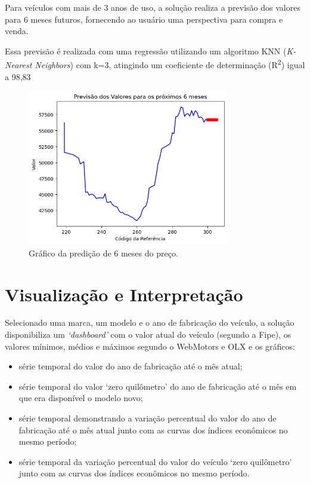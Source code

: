 \documentclass[conference]{IEEEtran}
\begin{document}
Para veículos com mais de 3 anos de uso, a solução realiza a previsão dos valores para 6 meses futuros, fornecendo ao usuário uma perspectiva para compra e venda.

Essa previsão é realizada com uma regressão utilizando um algoritmo KNN (\textit{K-Nearest Neighbors}) com k=3, atingindo um coeficiente de determinação (R\textsuperscript{2}) igual a 98,83%


\begin{figure}[htbp]
	\centerline{\includegraphics[width=250pt]{assets/previsao.png}}
	\caption{Gráfico da predição de 6 meses do preço.}
	\label{fig2}
\end{figure}


\section{Visualização e Interpretação}

Selecionado uma marca, um modelo e o ano de fabricação do veículo, a solução disponibiliza um \textit{`dashboard'} com o valor atual do veículo (segundo a Fipe), os valores mínimos, médios e máximos segundo o WebMotors e OLX e os gráficos:

\begin{itemize}
	\item série temporal do valor do ano de fabricação até o mês atual;
	\item série temporal do valor `zero quilômetro' do ano de fabricação até o mês em que era disponível o modelo novo;
	\item série temporal demonstrando a variação percentual do valor do ano de fabricação até o mês atual junto com as curvas dos índices econômicos no mesmo período;
	\item série temporal da variação percentual do valor do veículo `zero quilômetro' junto com as curvas dos índices econômicos no mesmo período.
\end{itemize}
\end{document}
